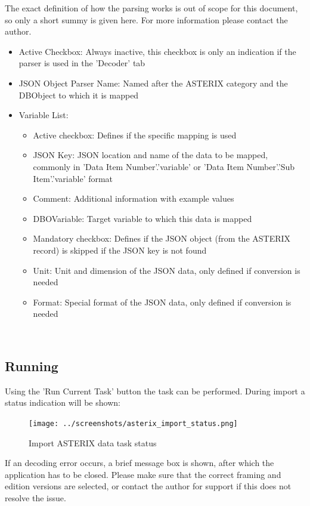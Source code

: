 The exact definition of how the parsing works is out of scope for this document, so only a short summy is given here. For more information please contact the author.


\begin{itemize}  
\item Active Checkbox: Always inactive, this checkbox is only an indication if the parser is used in the 'Decoder' tab
\item JSON Object Parser Name: Named after the ASTERIX category and the DBObject to which it is mapped
\item Variable List:
\begin{itemize}  
\item Active checkbox: Defines if the specific mapping is used
\item JSON Key: JSON location and name of the data to be mapped, commonly in 'Data Item Number'.'variable' or 'Data Item Number'.'Sub Item'.'variable' format
\item Comment: Additional information with example values
\item DBOVariable: Target variable to which this data is mapped
\item Mandatory checkbox: Defines if the JSON object (from the ASTERIX record) is skipped if the JSON key is not found
\item Unit: Unit and dimension of the JSON data, only defined if conversion is needed
\item Format: Special format of the JSON data, only defined if conversion is needed
\end{itemize}
\end{itemize}
\ \\

\subsection{Running}

Using the 'Run Current Task' button the task can be performed. During import a status indication will be shown:

\begin{figure}[H]
  \center
    \texttt{[image: ../screenshots/asterix\_import\_status.png]}
  \caption{Import ASTERIX data task status}
\end{figure}

If an decoding error occurs, a brief message box is shown, after which the application has to be closed. Please make sure that the correct framing and edition versions are selected, or contact the author for support if this does not resolve the issue. \\

